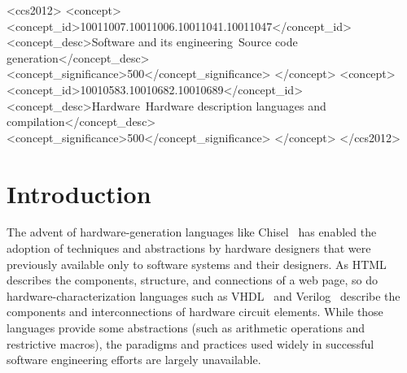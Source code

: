 \documentclass[sigplan,anonymous,review]{acmart}
\begin{document}
\begin{CCSXML}
<ccs2012>
<concept>
<concept_id>10011007.10011006.10011041.10011047</concept_id>
<concept_desc>Software and its engineering~Source code generation</concept_desc>
<concept_significance>500</concept_significance>
</concept>
<concept>
<concept_id>10010583.10010682.10010689</concept_id>
<concept_desc>Hardware~Hardware description languages and compilation</concept_desc>
<concept_significance>500</concept_significance>
</concept>
</ccs2012>
\end{CCSXML}



\maketitle

\section{Introduction}

The advent of hardware-generation languages like Chisel~\cite{chisel:article} has enabled the adoption of techniques and abstractions by hardware designers that were previously available only to software systems and their designers. As HTML describes the components, structure, and connections of a web page, so do hardware-characterization languages such as VHDL~\cite{vhdl} and Verilog~\cite{verilog} describe the components and interconnections of hardware circuit elements. While those languages provide some abstractions (such as arithmetic operations and restrictive macros), the paradigms and practices used widely in successful software engineering efforts are largely unavailable.
\end{document}
